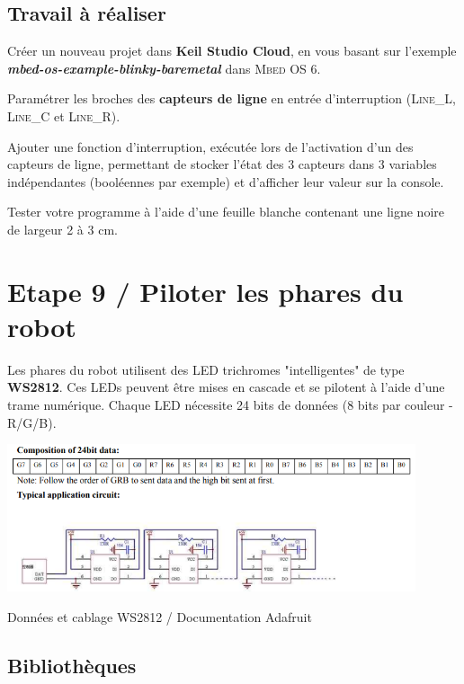 \documentclass[a4paper,11pt,titlepage]{article} %
\begin{document}
\subsection{Travail à réaliser}

\Manip Créer un nouveau projet dans \textbf{Keil Studio Cloud}, en vous basant sur l'exemple \textbf{\textsl{mbed-os-example-blinky-baremetal}} dans \textsc{Mbed OS 6}.

\Manip Paramétrer les broches des \textbf{capteurs de ligne} en entrée d'interruption (\textsc{Line\_L}, \textsc{Line\_C} et \textsc{Line\_R}).

\Manip Ajouter une fonction d'interruption, exécutée lors de l'activation d'un des capteurs de ligne, permettant de stocker l'état des 3 capteurs dans 3 variables indépendantes (booléennes par exemple) et d'afficher leur valeur sur la console.

\Manip Tester votre programme à l'aide d'une feuille blanche contenant une ligne noire de largeur 2 à 3 cm.

\newpage
\section{Etape 9 / Piloter les phares du robot}

Les phares du robot utilisent des LED trichromes "intelligentes" de type \textbf{WS2812}. Ces LEDs peuvent être mises en cascade et se pilotent à l'aide d'une trame numérique. Chaque LED nécessite 24 bits de données (8 bits par couleur - R/G/B).

\begin{center}
	\includegraphics[width=0.9\textwidth]{images/W2812.png}
	
	Données et cablage WS2812 / Documentation Adafruit
\end{center}


\subsection{Bibliothèques }
\end{document}
